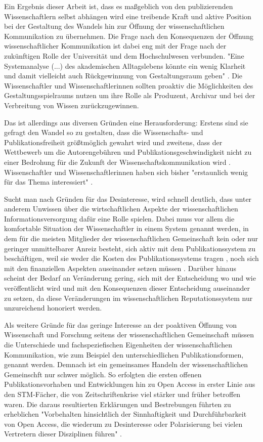 Ein Ergebnis dieser Arbeit ist, dass es maßgeblich von den publizierenden Wissenschaftlern selbst abhängen wird eine treibende Kraft und aktive Position bei der Gestaltung des Wandels hin zur Öffnung der wissenschaftlichen Kommunikation zu übernehmen. Die Frage nach den Konsequenzen der Öffnung wissenschaftlicher Kommunikation ist dabei eng mit der Frage nach der zukünftigen Rolle der Universität und dem Hochschulwesen verbunden. "Eine Systemanalyse (...) des akademischen Alltagslebens  könnte  ein wenig Klarheit und damit vielleicht auch Rückgewinnung von Ge­staltungsraum geben" \cite{Warnke_2012}. Die Wissenschaftler und Wissenschaftlerinnen sollten proaktiv die Möglichkeiten des Gestaltungsspielraums nutzen um ihre Rolle als Produzent, Archivar und bei der Verbreitung von Wissen zurückzugewinnen.

Das ist allerdings aus diversen Gründen eine Herausforderung: Erstens sind sie gefragt den Wandel so zu gestalten, dass die Wissenschafts- und Publikationsfreiheit größtmöglich gewahrt wird und zweitens, dass der Wettbewerb um die Autorengebühren und Publikationsgeschwindigkeit nicht zu einer Bedrohung für die Zukunft der Wissenschaftskommunikation wird \cite{Beall_2012} \cite{Lossau_oa_2007}. Wissenschaftler und Wissenschaftlerinnen haben sich bisher "erstaunlich wenig für das Thema interessiert" \cite{hagner_2015_sache_buches}.

Sucht man nach Gründen für das Desinteresse, wird schnell deutlich, dass unter anderem Unwissen über die wirtschaftlichen Aspekte der wissenschaftlichen Informationsversorgung dafür eine Rolle spielen. Dabei muss vor allem die komfortable Situation der Wissenschaftler in einem System genannt werden, in dem für die meisten Mitglieder der wissenschaftlichen Gemeinschaft kein oder nur geringer unmittelbarer Anreiz besteht, sich aktiv mit dem Publikationssystem zu beschäftigen, weil sie weder die Kosten des Publikationssystems tragen \cite{Sietmann_oa_2007}, noch sich mit den finanziellen Aspekten auseinander setzen müssen \cite{herb_2010}. Darüber hinaus scheint der Bedarf an Veränderung gering, sich mit der Entscheidung wo und wie veröffentlicht wird und mit den Konsequenzen dieser Entscheidung auseinander zu setzen, da diese Veränderungen im wissenschaftlichen Reputationssystem nur unzureichend honoriert werden.

Als weitere Gründe für das geringe Interesse an der poaktiven Öffnung von Wissenschaft und Forschung seitens der wissenschaftlichen Gemeinschaft müssen die Unterschiede und fachspeziefischen Eigenheiten der wissenschaftlichen Kommunikation, wie zum Beispiel den unterschiedlichen Publikationsformen, genannt werden. Demnach ist ein gemeinsames Handeln der wissenschaftlichen Gemeinschft nur schwer möglich. So erfolgten die ersten offenen Publikationsvorhaben und Entwicklungen hin zu Open Access in erster Linie aus den STM-Fächer, die von Zeitschriftenkrise viel stärker und früher betroffen waren. Die daraus resultierten Erklärungen und Bestrebungen führten zu erheblichen "Vorbehalten hinsichtlich der Sinnhaftigkeit und Durchführbarkeit von Open Access, die wiederum zu Desinteresse oder Polarisierung bei vielen Vertretern dieser Disziplinen führen" \cite{naeder_2010_open}.

